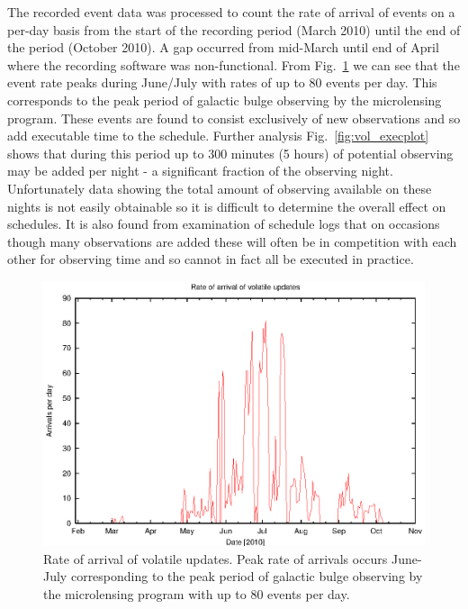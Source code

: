 The recorded event data was processed to count the rate of arrival of events on a per-day basis from the start of the recording period (March 2010) until the end of the period (October 2010). A gap occurred from mid-March until end of April where the recording software was non-functional. From Fig.~\ref{fig:vol_rateplot} we can see that the event rate peaks during June/July with rates of up to 80 events per day. This corresponds to the peak period of galactic bulge observing by the microlensing program. These events are found to consist exclusively of new observations and so add executable time to the schedule. Further analysis Fig.~\ref{fig:vol_execplot} shows that during this period up to 300 minutes (5 hours) of potential observing may be added per night - a significant fraction of the observing night. Unfortunately data showing the total amount of observing available on these nights is not easily obtainable so it is difficult to determine the overall effect on schedules. It is also found from examination of schedule logs that on occasions though many observations are added these will often be in competition with each other for observing time and so cannot in fact all be executed in practice.


\begin{figure}[htbp]
\begin{center}
    \includegraphics[scale=1.0, angle=0]{figures/volrate.eps}
\end{center}
\caption[Rate of arrival of volatile updates.]
{Rate of arrival of volatile updates. Peak rate of arrivals occurs June-July corresponding to the peak period of galactic bulge observing by the microlensing program with up to 80 events per day.}
\label{fig:vol_rateplot}
\end{figure}

